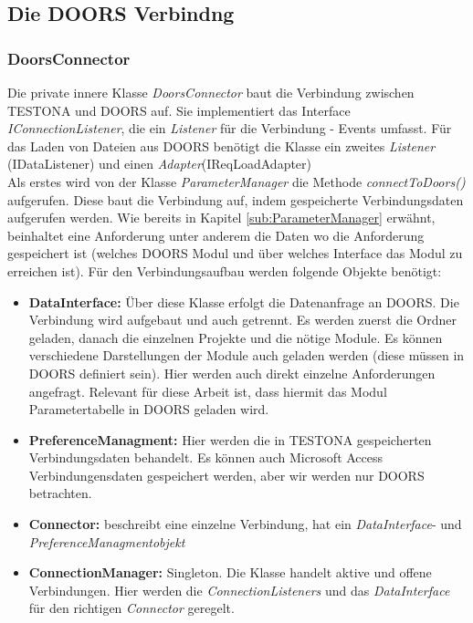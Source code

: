 \subsection{Die DOORS Verbindng}\label{sub.DoorsConn}
\subsubsection{DoorsConnector}


Die private innere Klasse \textit{DoorsConnector} baut die Verbindung zwischen TESTONA und DOORS auf. Sie implementiert das Interface \textit{IConnectionListener}, die ein \textit{Listener} für die Verbindung - Events umfasst. Für das Laden von Dateien aus DOORS benötigt die Klasse ein zweites \textit{Listener} (IDataListener) und einen \textit{Adapter}(IReqLoadAdapter) \\

Als erstes wird von der Klasse \textit{ParameterManager} die Methode \textit{connectToDoors()} aufgerufen. Diese baut die Verbindung auf, indem gespeicherte Verbindungsdaten aufgerufen werden. Wie bereits in Kapitel \ref{sub:ParameterManager} erwähnt, beinhaltet eine Anforderung unter anderem die Daten wo die Anforderung gespeichert ist (welches DOORS Modul und über welches Interface das Modul zu erreichen ist). Für den Verbindungsaufbau werden folgende Objekte benötigt:

\begin{itemize}
\item \textbf{DataInterface: }Über diese Klasse erfolgt die Datenanfrage an DOORS. Die Verbindung wird aufgebaut und auch getrennt. Es werden zuerst die Ordner geladen, danach die einzelnen Projekte und die nötige Module. Es können verschiedene Darstellungen der Module auch geladen werden (diese müssen in DOORS definiert sein). Hier werden auch direkt einzelne Anforderungen angefragt. Relevant für diese Arbeit ist, dass hiermit das Modul Parametertabelle in DOORS geladen wird.

\item \textbf{PreferenceManagment: } Hier werden die in TESTONA gespeicherten Verbindungsdaten behandelt. Es können auch Microsoft Access Verbindungensdaten gespeichert werden, aber wir werden nur DOORS betrachten.

\item \textbf{Connector: }beschreibt eine einzelne Verbindung, hat ein \textit{DataInterface}- und \textit{PreferenceManagmentobjekt}

\item \textbf{ConnectionManager: }Singleton. Die Klasse handelt aktive und offene Verbindungen. Hier werden die \textit{ConnectionListeners} und das \textit{DataInterface} für den richtigen \textit{Connector} geregelt.

\end{itemize}


